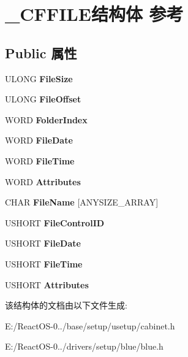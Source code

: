 \hypertarget{struct___c_f_f_i_l_e}{}\section{\+\_\+\+C\+F\+F\+I\+L\+E结构体 参考}
\label{struct___c_f_f_i_l_e}
\subsection*{Public 属性}
\begin{DoxyCompactItemize}
\item 
\mbox{\label{struct___c_f_f_i_l_e_a986ee036d29e5e0b4fc7018399788db6}} 
U\+L\+O\+NG {\bfseries File\+Size}
\item 
\mbox{\label{struct___c_f_f_i_l_e_a9eaf91c7c675be4cd41cd00a1c164051}} 
U\+L\+O\+NG {\bfseries File\+Offset}
\item 
\mbox{\label{struct___c_f_f_i_l_e_ab7b0ca412f9c8b753e06622b268cc0b1}} 
W\+O\+RD {\bfseries Folder\+Index}
\item 
\mbox{\label{struct___c_f_f_i_l_e_adfa0dee930089223bfb0137953eaec48}} 
W\+O\+RD {\bfseries File\+Date}
\item 
\mbox{\label{struct___c_f_f_i_l_e_a9d262ee632a49540cec33b134b0e89b1}} 
W\+O\+RD {\bfseries File\+Time}
\item 
\mbox{\label{struct___c_f_f_i_l_e_aed485cb4608c5500cce3c48b7254c4b9}} 
W\+O\+RD {\bfseries Attributes}
\item 
\mbox{\label{struct___c_f_f_i_l_e_a64a7edab46fb3351195d7e42405a6bb3}} 
C\+H\+AR {\bfseries File\+Name} \mbox{[}A\+N\+Y\+S\+I\+Z\+E\+\_\+\+A\+R\+R\+AY\mbox{]}
\item 
\mbox{\label{struct___c_f_f_i_l_e_a6de2b31d5e841e5fd5ec9d8b83c6c418}} 
U\+S\+H\+O\+RT {\bfseries File\+Control\+ID}
\item 
\mbox{\label{struct___c_f_f_i_l_e_adfa0dee930089223bfb0137953eaec48}} 
U\+S\+H\+O\+RT {\bfseries File\+Date}
\item 
\mbox{\label{struct___c_f_f_i_l_e_a9d262ee632a49540cec33b134b0e89b1}} 
U\+S\+H\+O\+RT {\bfseries File\+Time}
\item 
\mbox{\label{struct___c_f_f_i_l_e_aed485cb4608c5500cce3c48b7254c4b9}} 
U\+S\+H\+O\+RT {\bfseries Attributes}
\end{DoxyCompactItemize}


该结构体的文档由以下文件生成\+:\begin{DoxyCompactItemize}
\item 
E\+:/\+React\+O\+S-\/0../base/setup/usetup/cabinet.\+h\item 
E\+:/\+React\+O\+S-\/0../drivers/setup/blue/blue.\+h\end{DoxyCompactItemize}
